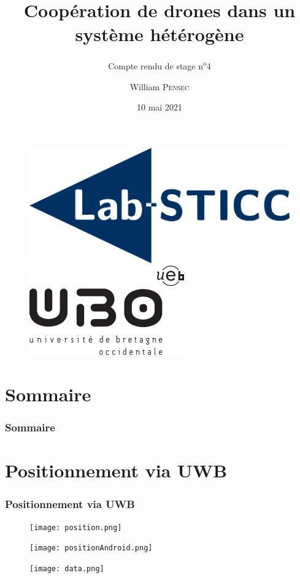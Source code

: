 \documentclass[12pt]{beamer}
\title[Compte rendu de stage n\textsuperscript{o}4]{Coopération de drones dans un système hétérogène}
\subtitle{Compte rendu de stage n\textsuperscript{o}4}
\author{William \textsc{Pensec}}
\institute[Lab-STICC]{Lab-Sticc}
\date{10 mai 2021}
\begin{document}
	\begin{frame}
		\begin{titlepage}
			\begin{figure}[H]
				\centering
				\includegraphics[scale=.15]{labsticc.png}
				\hspace{3cm}
				\includegraphics[scale=.3]{ubo.png}
			\end{figure}
		\end{titlepage}
	\end{frame}
	
	\section*{Sommaire}
	\begin{frame}
		\frametitle{Sommaire}
		\begin{center}
			\tableofcontents
		\end{center}
	\end{frame}
	\section{Positionnement via UWB}	
	\begin{frame}[allowframebreaks]
    	\frametitle{Positionnement via UWB}
    	    \begin{figure}[H]
				\centering
				\texttt{[image: position.png]}
			\end{figure}
			\begin{figure}[H]
				\centering
				\texttt{[image: positionAndroid.png]}
			\end{figure}
			\begin{figure}[H]
				\centering
				\texttt{[image: data.png]}
			\end{figure}
	\end{frame}
\end{document}
